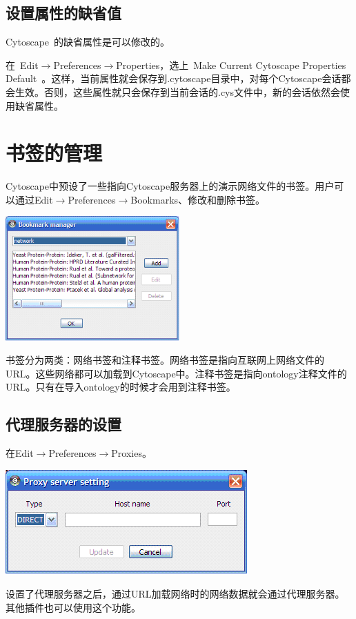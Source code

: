 \subsection{设置属性的缺省值}
Cytoscape~的缺省属性是可以修改的。

在~Edit$\rightarrow$Preferences$\rightarrow$Properties，选上~Make Current Cytoscape Properties Default~。这样，当前属性就会保存到.cytoscape目录中，对每个Cytoscape会话都会生效。否则，这些属性就只会保存到当前会话的.cys文件中，新的会话依然会使用缺省属性。

\section{书签的管理}

 Cytoscape中预设了一些指向Cytoscape服务器上的演示网络文件的书签。用户可以通过Edit$\rightarrow$Preferences$\rightarrow$Bookmarks、修改和删除书签。 

\begin{center}
\includegraphics[width=0.5\textwidth]{images/BookmarkManager.png} 
\end{center}

书签分为两类：网络书签和注释书签。网络书签是指向互联网上网络文件的URL。这些网络都可以加载到Cytoscape中。注释书签是指向ontology注释文件的URL。只有在导入ontology的时候才会用到注释书签。
 
\subsection{代理服务器的设置}
在Edit$\rightarrow$Preferences$\rightarrow$Proxies。

\begin{center}
\includegraphics[width=.6\textwidth]{images/ProxyServerSetting.png} 
\end{center}

设置了代理服务器之后，通过URL加载网络时的网络数据就会通过代理服务器。其他插件也可以使用这个功能。
